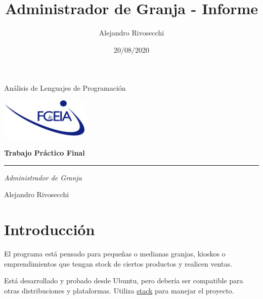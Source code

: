 \documentclass[a4paper,10pt]{article}
\title{Administrador de Granja - Informe}
\author{Alejandro Rivosecchi}
\date{20/08/2020}
\begin{document}
\begin{titlepage}
  \vspace*{2cm}
  \begin{center}
  \large{Análisis de Lenguajes de Programación\\}
  \end{center}
  \begin{center}
  \includegraphics[height=2cm]{fceia-logo.png}
  \end{center}
  
  \vspace{4cm}
  {\fontsize{28}{28}\selectfont\bfseries \hspace*{4cm} Trabajo Práctico Final}
  \hfill
\begin{center}
  {\color{gris}\hrule}
  \Large{\itshape Administrador de Granja}
\end{center}
    
  \vspace{13cm}
  {\large Alejandro Rivosecchi \hfill \makeatletter \@date \makeatother}
\end{titlepage}

\section{Introducción}
El programa está pensado para pequeñas o medianas granjas, kioskos o emprendimientos que tengan stock de ciertos productos y realicen ventas.

Está desarrollado y probado desde Ubuntu, pero debería ser compatible para otras distribuciones y plataformas. Utiliza \href{https://docs.haskellstack.org/en/stable/install_and_upgrade/}{stack} para manejar el proyecto.
\end{document}
